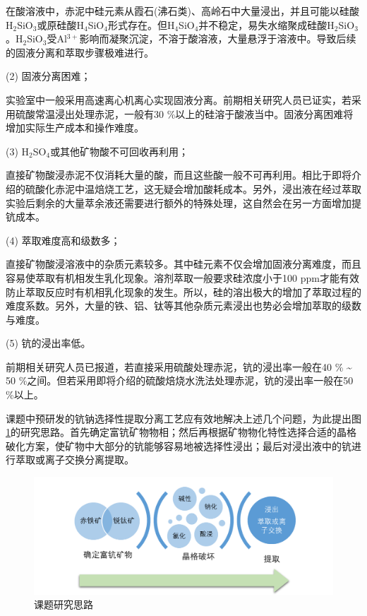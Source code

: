 在酸溶液中，赤泥中硅元素从霞石(沸石类)、高岭石中大量浸出，并且可能以硅酸H$ _{\mathrm{2}} $SiO$ _{\mathrm{3}} $或原硅酸H$ _{\mathrm{4}} $SiO$ _{\mathrm{4}} $形式存在。但H$ _{\mathrm{4}} $SiO$ _{\mathrm{4}} $并不稳定，易失水缩聚成硅酸H$ _{\mathrm{2}} $SiO$ _{\mathrm{3}} $。H$ _{\mathrm{2}} $SiO$ _{\mathrm{3}} $受Al$ ^{\mathrm{3+}} $影响而凝聚沉淀，不溶于酸溶液，大量悬浮于溶液中。导致后续的固液分离和萃取步骤极难进行。

(2) 固液分离困难；

实验室中一般采用高速离心机离心实现固液分离。前期相关研究人员已证实，若采用硫酸常温浸出处理赤泥，一般有30 \%以上的硅溶于酸液当中\cite{borra2015leaching,wang2013recovery}。固液分离困难将增加实际生产成本和操作难度。

(3) H$ _{\mathrm{2}} $SO$ _{\mathrm{4}} $或其他矿物酸不可回收再利用；

直接矿物酸浸赤泥不仅消耗大量的酸，而且这些酸一般不可再利用。相比于即将介绍的硫酸化赤泥中温焙烧工艺，这无疑会增加酸耗成本。另外，浸出液在经过萃取实验后剩余的大量萃余液还需要进行额外的特殊处理，这自然会在另一方面增加提钪成本。

(4) 萃取难度高和级数多；

直接矿物酸浸溶液中的杂质元素较多。其中硅元素不仅会增加固液分离难度，而且容易使萃取有机相发生乳化现象。溶剂萃取一般要求硅浓度小于100 ppm才能有效防止萃取反应时有机相乳化现象的发生\cite{Marongju2007,denghaixia2011}。所以，硅的溶出极大的增加了萃取过程的难度系数。另外，大量的铁、铝、钛等其他杂质元素浸出也势必会增加萃取的级数与难度。

(5) 钪的浸出率低。

前期相关研究人员已报道，若直接采用硫酸处理赤泥，钪的浸出率一般在40 \% \textasciitilde{ }50 \%之间\cite{borra2015leaching,wang2013recovery}。但若采用即将介绍的硫酸焙烧水洗法处理赤泥，钪的浸出率一般在50 \%以上。

课题中预研发的钪钠选择性提取分离工艺应有效地解决上述几个问题，为此提出图\ref{technicalroute}的研究思路。首先确定富钪矿物物相；然后再根据矿物物化特性选择合适的晶格破化方案，使矿物中大部分的钪能够容易地被选择性浸出；最后对浸出液中的钪进行萃取或离子交换分离提取。

\begin{figure}[!h]
	\centering
	\setlength{\belowcaptionskip}{6pt plus0.3ex minus 0.06ex}
	\includegraphics[width=\linewidth]{Figures/c1/technicalroute.pdf}%
	\caption{课题研究思路}\label{technicalroute}
\end{figure}
